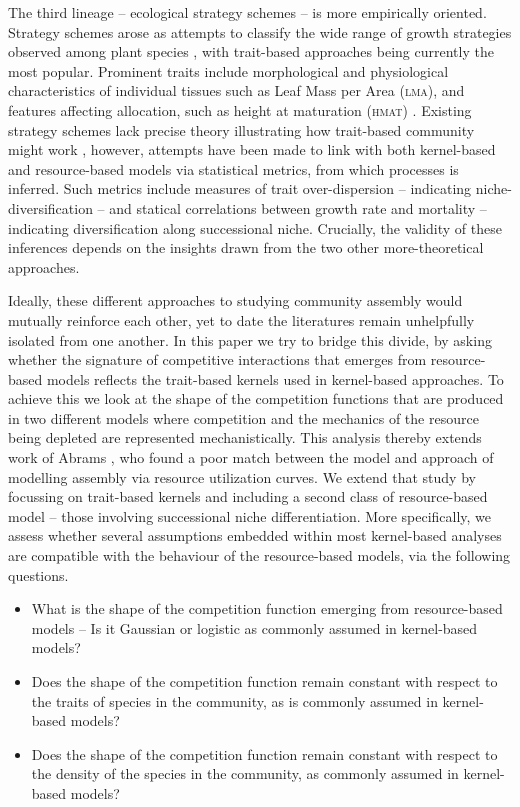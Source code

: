 \documentclass[a4paper,11pt]{article}
\begin{document}
The third lineage -- ecological  strategy schemes -- is more empirically
oriented. Strategy schemes arose as attempts to classify the wide range 
of growth strategies observed among plant species
\citep{Grime-1974,Grime-1979,Southwood-1977,Weiher-1999,Westoby-2002}, with
trait-based approaches \citep{Weiher-1999,Westoby-2002} being currently
the most popular.
%
Prominent traits include morphological and physiological characteristics
of individual tissues such as Leaf Mass per Area (\textsc{lma}), and features
affecting allocation, such as height at maturation (\textsc{hmat}) 
\citep{Westoby-2002}.
%
Existing strategy schemes lack precise theory illustrating how trait-based
community might work \citep{Adler-2013}, however, attempts have been made to
link with both kernel-based and resource-based models via statistical metrics,
 from which processes is inferred.
%
Such metrics include measures of trait over-dispersion \citep[e.g.][]{Kraft-2008}
-- indicating niche-diversification --
and statical correlations between growth rate and mortality 
\citep[e.g.][]{Wright-2010} -- indicating diversification along successional niche.
% 
Crucially, the validity of these inferences depends on the insights drawn from
the two other more-theoretical approaches.


Ideally, these different approaches to studying community assembly would
mutually reinforce each other, yet to date the literatures remain unhelpfully
isolated from one another. In this paper we try to bridge this divide, by asking
whether the signature of competitive interactions that emerges from resource-based
models reflects the trait-based kernels used in kernel-based approaches. 
% 
To achieve this we look at the shape of the competition functions that
are produced in two different models where
competition and the mechanics of the resource being depleted are represented mechanistically.
%
This analysis thereby extends work of Abrams \citet{Abrams-2008}, who found a
poor match between the \Rstar model and approach of modelling assembly via resource
utilization curves. We extend that study by focussing
on trait-based kernels and including a second class of resource-based
model -- those involving successional niche differentiation. 
%
More specifically, we assess whether several assumptions embedded within
most kernel-based analyses are compatible with the behaviour of the
resource-based models, via the following questions.
\begin{itemize}
\item What is the shape of the competition function emerging from resource-based
models -- Is it Gaussian or logistic as commonly assumed in kernel-based models?
\item Does the shape of the competition function remain constant with
respect to the traits of species in the community, as is commonly assumed in kernel-
based models? 
\item Does the shape of the competition function remain constant with
respect to the density of the species in the community, as commonly assumed in
kernel-based models?
\end{itemize}
\end{document}
